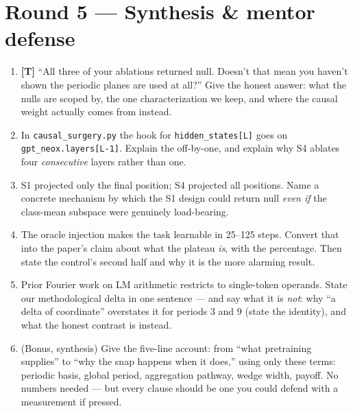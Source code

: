 \documentclass[11pt]{article}
\newcommand{\trap}{\textcolor{trapcol}{\textbf{[T]}}}
\begin{document}
\section*{Round 5 --- Synthesis \& mentor defense}
\begin{enumerate}[leftmargin=*,itemsep=4pt,start=21]
\item \trap{} ``All three of your ablations returned null. Doesn't that mean you
haven't shown the periodic planes are used at all?'' Give the honest answer: what
the nulls are scoped by, the one characterization we keep, and where the causal
weight actually comes from instead.
\item In \texttt{causal\_surgery.py} the hook for \texttt{hidden\_states[L]} goes on
\texttt{gpt\_neox.layers[L-1]}. Explain the off-by-one, and explain why S4 ablates
four \emph{consecutive} layers rather than one.
\item S1 projected only the final position; S4 projected all positions. Name a
concrete mechanism by which the S1 design could return null \emph{even if} the
class-mean subspace were genuinely load-bearing.
\item The oracle injection makes the task learnable in 25--125 steps. Convert that
into the paper's claim about what the plateau \emph{is}, with the percentage. Then
state the control's second half and why it is the more alarming result.
\item Prior Fourier work on LM arithmetic restricts to single-token operands.
State our methodological delta in one sentence --- and say what it is
\emph{not}: why ``a delta of coordinate'' overstates it for periods 3 and 9
(state the identity), and what the honest contrast is instead.
\item (Bonus, synthesis) Give the five-line account: from ``what pretraining
supplies'' to ``why the snap happens when it does,'' using only these terms:
periodic basis, global period, aggregation pathway, wedge width, payoff. No
numbers needed --- but every clause should be one you could defend with a
measurement if pressed.
\end{enumerate}
\end{document}
